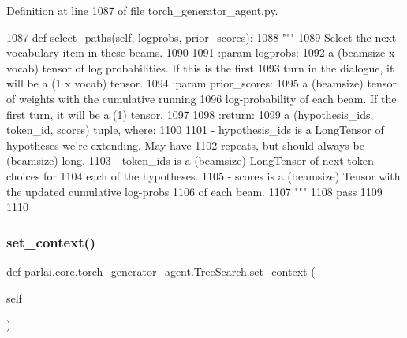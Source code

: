 Definition at line 1087 of file torch\+\_\+generator\+\_\+agent.\+py.


\begin{DoxyCode}
1087     \textcolor{keyword}{def }select\_paths(self, logprobs, prior\_scores):
1088         \textcolor{stringliteral}{"""}
1089 \textcolor{stringliteral}{        Select the next vocabulary item in these beams.}
1090 \textcolor{stringliteral}{}
1091 \textcolor{stringliteral}{        :param logprobs:}
1092 \textcolor{stringliteral}{            a (beamsize x vocab) tensor of log probabilities. If this is the first}
1093 \textcolor{stringliteral}{            turn in the dialogue, it will be a (1 x vocab) tensor.}
1094 \textcolor{stringliteral}{        :param prior\_scores:}
1095 \textcolor{stringliteral}{            a (beamsize) tensor of weights with the cumulative running}
1096 \textcolor{stringliteral}{            log-probability of each beam. If the first turn, it will be a (1) tensor.}
1097 \textcolor{stringliteral}{}
1098 \textcolor{stringliteral}{        :return:}
1099 \textcolor{stringliteral}{            a (hypothesis\_ids, token\_id, scores) tuple, where:}
1100 \textcolor{stringliteral}{}
1101 \textcolor{stringliteral}{            - hypothesis\_ids is a LongTensor of hypotheses we're extending. May have}
1102 \textcolor{stringliteral}{              repeats, but should always be (beamsize) long.}
1103 \textcolor{stringliteral}{            - token\_ids is a (beamsize) LongTensor of next-token choices for}
1104 \textcolor{stringliteral}{              each of the hypotheses.}
1105 \textcolor{stringliteral}{            - scores is a (beamsize) Tensor with the updated cumulative log-probs}
1106 \textcolor{stringliteral}{              of each beam.}
1107 \textcolor{stringliteral}{        """}
1108         \textcolor{keywordflow}{pass}
1109 
1110 
\end{DoxyCode}
\mbox{\label{classparlai_1_1core_1_1torch__generator__agent_1_1TreeSearch_a4706cbec7117a8a2696774c044fc0729}} 
\subsubsection{\texorpdfstring{set\+\_\+context()}{set\_context()}}
{\footnotesize\ttfamily def parlai.\+core.\+torch\+\_\+generator\+\_\+agent.\+Tree\+Search.\+set\+\_\+context (\begin{DoxyParamCaption}\item[{}]{self }\end{DoxyParamCaption})}



